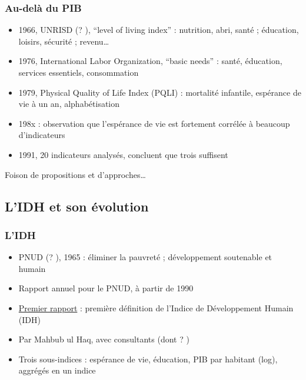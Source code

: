 \documentclass[french]{beamer}
\begin{document}
\begin{frame}
	\frametitle{Au-delà du PIB}
	\begin{itemize}
		\item 1966, UNRISD (? ), “level of living index” : nutrition, abri, santé ; éducation, loisirs, sécurité ; revenu…
		\item 1976, International Labor Organization, “basic needs” : santé, éducation, services essentiels, consommation
		\item 1979, Physical Quality of Life Index (PQLI) : mortalité infantile, espérance de vie à un an, alphabétisation
		\item 198x : observation que l’espérance de vie est fortement corrélée à beaucoup d’indicateurs
		\item 1991, 20 indicateurs analysés, concluent que trois suffisent
	\end{itemize}
  Foison de propositions et d’approches…
\end{frame}

\subsection{L’IDH et son évolution}
\begin{frame}
	\frametitle{L’IDH}
	\begin{itemize}
		\item PNUD (? ), 1965 : éliminer la pauvreté ; développement soutenable et humain
		\item Rapport annuel pour le PNUD, à partir de 1990
		\item \href{https://hdr.undp.org/content/human-development-report-1990}{Premier rapport} : première définition de l’Indice de Développement Humain (IDH)
		\item Par Mahbub ul Haq, avec consultants (dont ? \onslide<3->{Amartya Sen})
		\item Trois sous-indices : espérance de vie, éducation, PIB par habitant (log), aggrégés en un indice
	\end{itemize}
\end{frame}
\end{document}
